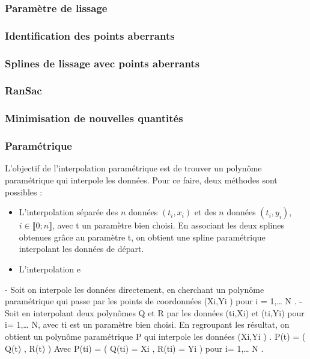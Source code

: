 \documentclass[a4paper,10pt]{article} %
\begin{document}
\subsubsection*{Paramètre de lissage}

\subsubsection*{Identification des points aberrants}

\subsubsection*{Splines de lissage avec points aberrants}

\subsubsection*{RanSac}

\subsubsection*{Minimisation de nouvelles quantités}

\subsubsection*{Paramétrique}

L'objectif de l'interpolation paramétrique est de trouver un polynôme paramétrique qui interpole les données. Pour ce faire, deux méthodes sont possibles :
\begin{itemize}
\item L'interpolation séparée des $n$ données $(t_i,x_i)$ et des $n$ données $(t_i,y_i)$, $i\in\llbracket 0; n \rrbracket$, avec t un paramètre bien choisi. En associant les deux splines obtenues grâce au paramètre t, on obtient une spline paramétrique interpolant les données de départ.
\item L'interpolation e
\end{itemize}
-          Soit on interpole les données directement,  en cherchant un polynôme paramétrique qui passe par les points de coordonnées (Xi,Yi )   pour   i =  1,… N .
-          Soit en interpolant deux polynômes Q et R par les données (ti,Xi) et (ti,Yi) pour i= 1,… N, avec ti est un paramètre bien choisi. En regroupant les résultat, on obtient un polynôme paramétrique P qui interpole les données (Xi,Yi ) .
                P(t) = ( Q(t) , R(t) )
                         Avec      P(ti) = ( Q(ti) = Xi , R(ti) = Yi )     pour  i= 1,… N .
 
\end{document}

